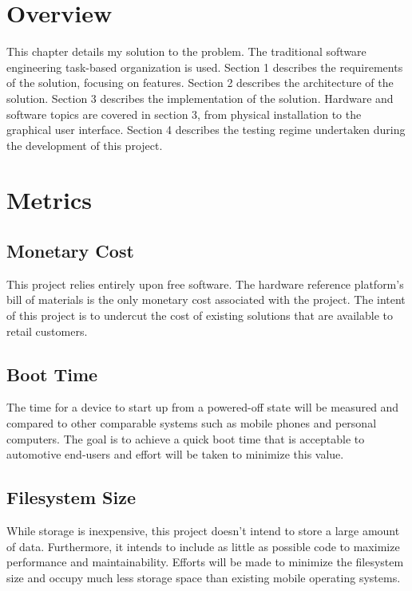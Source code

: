 \section{Overview}

This chapter details my solution to the problem.
The traditional software engineering task-based organization is used.
Section 1 describes the requirements of the solution, focusing on features.
Section 2 describes the architecture of the solution.
Section 3 describes the implementation of the solution.
Hardware and software topics are covered in section 3, from physical installation to the graphical user interface.
Section 4 describes the testing regime undertaken during the development of this project.



\section{Metrics}

\subsection{Monetary Cost}

This project relies entirely upon free software.
The hardware reference platform's bill of materials is the only monetary cost associated with the project.
The intent of this project is to undercut the cost of existing solutions that are available to retail customers.

\subsection{Boot Time}

The time for a device to start up from a powered-off state will be measured and compared to other comparable systems such as mobile phones and personal computers.
The goal is to achieve a quick boot time that is acceptable to automotive end-users and effort will be taken to minimize this value.

\subsection{Filesystem Size}

While storage is inexpensive, this project doesn't intend to store a large amount of data.
Furthermore, it intends to include as little as possible code to maximize performance and maintainability.
Efforts will be made to minimize the filesystem size and occupy much less storage space than existing mobile operating systems.


